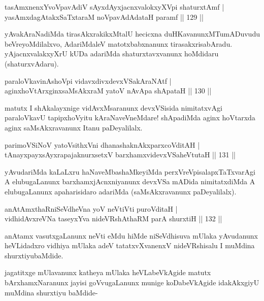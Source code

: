 \begin{shl}
tasAmxnenxYvoVpavAdiV sAyxdAyxjacnxvalokxyXV\s pi shaturxtAmf |\\
yasAmxdagAtakxSaTxtaraM noVpavAdAdataH paramf \hfill || 129 ||
\end{shl}

\begin{artha}
yAvakAraNadiMda tirasAkxrakikxMtalU hecicxna duHKavanunxMTumADuvudu beVreyoMdilalxvo, AdariMdaleV matotxbabxnanunx tirasakxrisabAradu. yAjacnxvalakxyXrU kUDa adariMda shaturxtavxvanunx hoMdidaru (shaturxvAdaru).
\end{artha}

\begin{shl}
paraloVkavinAshoV\s pi vidavxdivxdevxVSakAraNAtf |\\
aginxhoVtArxginxsaMsAkxraM yatoV nAvApa shApataH \hfill || 130 ||
\end{shl}

\begin{artha}
matutx I shAkalayxnige vidAvxMsaranunx devxVSisida nimitatxvAgi paraloVkavU tapipxhoVyitu kAraNaveVneMdare! shApadiMda aginx hoVtarxda aginx saMsAkxravanunx Itanu paDeyalilalx.
\end{artha}

\begin{shl}
parimoVSiNoV yatoV\s sithxVni dhanashaknAkxparxcoVditAH |\\
tAnayxpayxsAyxrapajaknurxsetxV barxhamxvidevxVSaheVtutaH \hfill || 131 ||
\end{shl}

\begin{artha}
yAvudariMda kaLaLxru haNaveMbashaMkeyiMda perxVreVpisalapxTaTxvarAgi A elubugaLanunx barxhamxjAcnxniyanunx devxVSa mADida nimitatxdiMda A elubugaLanunx apaharisidaro adariMda (saMsAkxravanunx paDeyalilalx).
\end{artha}

\begin{shl}
anAtAmxthaRniSeVdheVna yoV neVtiVti puroVditaH |\\
vidhidAvxreVNa taseyxYva nideVRshAthaRM parA shurxtiH \hfill || 132 ||
\end{shl}

\begin{artha}%
anAtamx vasutxgaLanunx neVti eMdu hiMde niSeVdhisuva mUlaka yAvudanunx heVLidadxro vidhiya mUlaka adeV tatatxvXvanenxV nideVRshisalu I muMdina shurxtiyubaMdide.

jagatitxge mUlavanunx katheya mUlaka heVLabeVkAgide matutx bArxhamxNaranunx jayisi goVvugaLanunx munige koDabeVkAgide idakAkxgiyU muMdina shurxtiyu baMdide-
\end{artha}

